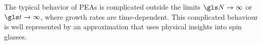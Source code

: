 %
%
%
%
%
%
The typical behavior of \GBM PEAs 
is complicated outside the limits $\N\to\infty$ or $\t\to\infty$, where growth rates are time-dependent. This complicated behaviour is well represented by an 
approximation that uses physical insights into spin glasses.

